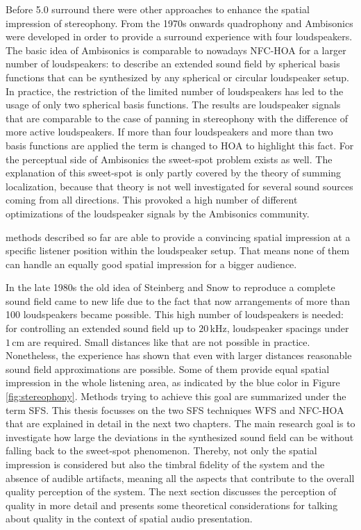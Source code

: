 Before 5.0 surround there were other approaches to enhance the spatial impression of
stereophony. From the 1970s onwards quadro\-phony and
Ambisonics\autocite{Gerzon1973} were developed in
order to provide a surround experience with four loudspeakers. The basic idea of
Ambisonics is comparable to nowadays \ac{NFC-HOA} for
a larger number of loudspeakers: to describe an extended sound field by spherical
basis functions that can be synthesized by any spherical or circular loudspeaker
setup. In practice, the restriction of the limited number of loudspeakers has led to the usage
of only two spherical basis functions. The results are
loudspeaker signals that are comparable to the case of panning in
stereophony with the difference of more active
loudspeakers.\autocite[E.g.][]{Frank2013}
If more than four loudspeakers and more than two basis functions
are applied the term is changed to \ac{HOA} to highlight this fact.
For the perceptual side of Ambisonics the sweet-spot problem exists as well.
The explanation of this sweet-spot is only partly covered by the
theory of summing localization, because that theory is not well investigated for
several sound sources coming from all directions. This provoked a high number of
different optimizations of the loudspeaker signals by the Ambisonics community.


 methods described so far are able to provide a
convincing spatial impression at a specific listener position within the
loudspeaker setup. That means none of them can handle an equally good spatial
impression for a bigger audience.

In the late 1980s the old idea of Steinberg and Snow to reproduce a
complete sound field came to new life due to the fact that now arrangements of
more than 100 loudspeakers became possible.\autocite{Berkhout1988}
This high number of loudspeakers is needed: for controlling an extended
sound field up to $20$\,kHz, loudspeaker spacings under $1$\,cm
are required. Small distances like that are not possible in practice. Nonetheless,
the experience has shown that even with larger distances reasonable sound field
approximations are possible. Some of them provide equal spatial impression in the
whole listening area, as indicated by the blue color in Figure\,\ref{fig:stereophony}.
Methods trying to achieve this goal are summarized under the term \acf{SFS}.
This thesis focusses on the two \ac{SFS} techniques \ac{WFS} and \ac{NFC-HOA}
that are explained in detail in the next two chapters.
The main research goal is to investigate how large the deviations in the
synthesized sound field can be without falling back to the sweet-spot
phenomenon. Thereby, not only the spatial impression is considered but also the
timbral fidelity of the system and the absence of audible artifacts,
meaning all the aspects that contribute to the overall quality
perception of the system.
The next section discusses the perception of quality in more detail and
presents some theoretical considerations for talking about quality in the context of spatial
audio presentation.


